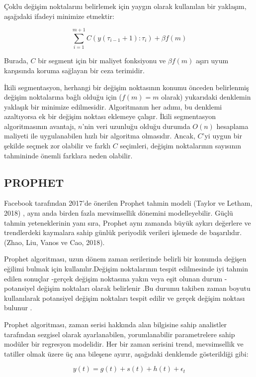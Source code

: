 \documentclass[12pt,twoside]{deuthesis}
\begin{document}
Çoklu değişim noktalarını belirlemek için yaygın olarak kullanılan bir yaklaşım, aşağıdaki ifadeyi minimize etmektir:

\[\sum_{i=1}^{m+1} C(y(\tau_{i-1}+1):\tau_i) + \beta f(m)\]

Burada, \(C\) bir segment için bir maliyet fonksiyonu ve \(\beta f(m)\) aşırı uyum karşısında koruma sağlayan bir ceza terimidir.

İkili segmentasyon, herhangi bir değişim noktasının konumu önceden belirlenmiş değişim noktalarına bağlı olduğu için (\(f(m) = m\) olarak) yukarıdaki denklemin yaklaşık bir minimize edilmesidir. Algoritmanın her adımı, bu denklemi azaltıyorsa ek bir değişim noktası eklemeye çalışır. İkili segmentasyon algoritmasının avantajı, \(n\)'nin veri uzunluğu olduğu durumda \(O(n)\) hesaplama maliyeti ile uygulanabilen hızlı bir algoritma olmasıdır. Ancak, \(C\)'yi uygun bir şekilde seçmek zor olabilir ve farklı \(C\) seçimleri, değişim noktalarının sayısının tahmininde önemli farklara neden olabilir.

\hypertarget{prophet}{%
\subsection{PROPHET}\label{prophet}}

Facebook tarafından 2017'de önerilen Prophet tahmin modeli (Taylor ve Letham, 2018) , aynı anda birden fazla mevsimsellik dönemini modelleyebilir. Güçlü tahmin yeteneklerinin yanı sıra, Prophet aynı zamanda büyük aykırı değerlere ve trendlerdeki kaymalara sahip günlük periyodik verileri işlemede de başarılıdır.(Zhao, Liu, Vanos ve Cao, 2018).

Prophet algoritması, uzun dönem zaman serilerinde belirli bir konumda değişen eğilimi bulmak için kullanılır.Değişim noktalarının tespit edilmesinde iyi tahmin edilen sonuçlar -gerçek değişim noktasına yakın veya eşit olunan durum - potansiyel değişim noktaları olarak belirlenir .Bu durumu takiben zaman boyutu kullanılarak potansiyel değişim noktaları tespit edilir ve gerçek değişim noktası bulunur .

Prophet algoritması, zaman serisi hakkında alan bilgisine sahip analistler tarafından sezgisel olarak ayarlanabilen, yorumlanabilir parametrelere sahip modüler bir regresyon modelidir. Her bir zaman serisini trend, mevsimsellik ve tatiller olmak üzere üç ana bileşene ayırır, aşağıdaki denklemde gösterildiği gibi:

\[ y(t) = g(t) + s(t) + h(t) + \epsilon_t \]
\end{document}
